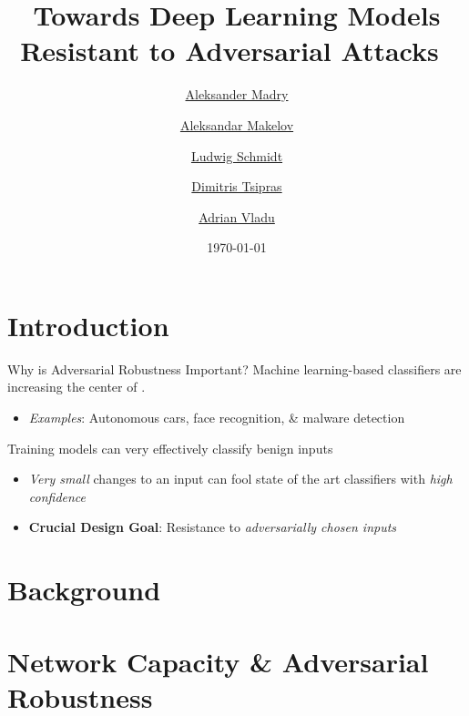 \documentclass[11pt,dvipsnames,usenames,aspectratio=169]{beamer}  %
\title[Towards Deep Robustness]{Towards Deep Learning Models \\ Resistant to Adversarial Attacks\texorpdfstring{~\cite{Madry:2017}}{}}
\author[Madry et al]{%
  \href{mailto:madry@mit.edu}{Aleksander Madry}\inst{1}  %
  \and
  \href{mailto:amakelov@mit.edu}{Aleksandar Makelov}\inst{1}  %
  \and
  \href{mailto:ludwigs@mit.edu}{Ludwig Schmidt}\inst{1}  %
  \and
  \href{mailto:tsipras@mit.edu}{Dimitris Tsipras}\inst{1}  %
  \and
  \href{mailto:avladu@mit.edu}{Adrian Vladu}\inst{1}  %
}
\institute[MIT]{%
  \textsuperscript{1}\textbf{MIT -- CSAIL}\\
}
\date{\today}
\renewcommand{\green}[1]{{\color{ForestGreen} #1}}
\begin{document}
\begin{frame}
  \titlepage
\end{frame}

\section{Introduction}
\begin{frame}{Why is Adversarial Robustness Important?}
  Machine learning-based classifiers are increasing the center of .
  \begin{itemize}
    \item \textit{Examples}: Autonomous cars, face recognition, \& malware detection
  \end{itemize}
  \vfill
  Training models can very effectively classify \green{benign} inputs
  \begin{itemize}
    \setlength\itemsep{6pt}
    \item \textit{Very small} changes to an input can fool state of the art classifiers with \textit{high confidence}
    \item \textbf{Crucial Design Goal}: Resistance to \textit{adversarially chosen inputs}
  \end{itemize}
\end{frame}

\section{Background}










\section{Network Capacity \& Adversarial Robustness}
\end{document}

